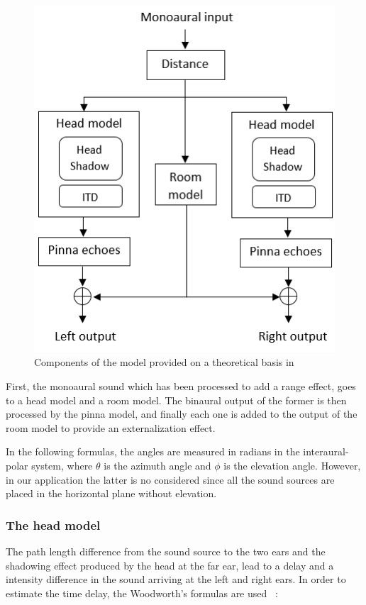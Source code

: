 \documentclass[journal]{IEEEtran}
\begin{document}
\begin{figure}
	\centering
		\includegraphics[scale=0.75]{graphics/graphic.png}
	\caption{Components of the model provided on a theoretical basis in~\cite{Brown1997}}
	\label{fig:workflow}
\end{figure}


First, the monoaural sound which has been processed to add a range effect, goes to a head model and a room model. The binaural output of the former is then processed by the pinna model, and finally each one is added to the output of the room model to provide an externalization effect.

In the following formulas, the angles are measured in radians in the interaural-polar system, where $\theta$ is the azimuth angle and $\phi$ is the elevation angle. However, in our application the latter is no considered since all the sound sources are placed in the horizontal plane without elevation.


\subsubsection{The head model}

The path length difference from the sound source to the two ears and the shadowing effect produced by the head at the far ear, lead to a delay and a intensity difference in the sound arriving at the left and right ears. In order to estimate the time delay, the Woodworth's formulas are used~\cite{Woodworth} :
\end{document}
